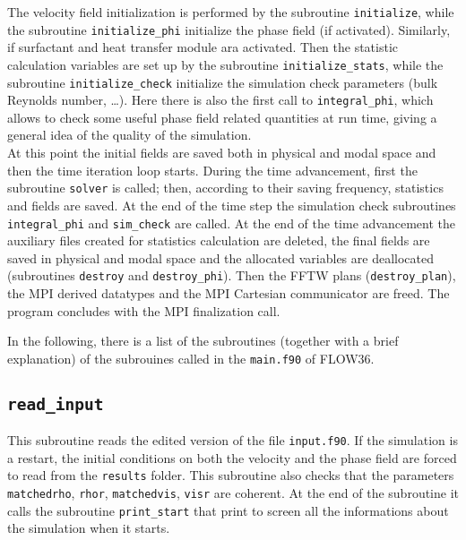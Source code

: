 The velocity field initialization is performed by the subroutine \texttt{initialize}, while the subroutine \texttt{initialize\_phi} initialize the phase field (if activated). 
Similarly, if surfactant and heat transfer module ara activated.
Then the statistic calculation variables are set up by the subroutine \texttt{initialize\_stats}, while the subroutine \texttt{initialize\_check} initialize the simulation check parameters (bulk Reynolds number, \dots). Here there is also the first call to \texttt{integral\_phi}, which allows to check some useful phase field related quantities at run time, giving a general idea of the quality of the simulation.\\
At this point the initial fields are saved both in physical and modal space and then the time iteration loop starts. During the time advancement, first the subroutine \texttt{solver} is called; then, according to their saving frequency, statistics and fields are saved. At the end of the time step  the simulation check subroutines \texttt{integral\_phi} and \texttt{sim\_check} are called.
At the end of the time advancement the auxiliary files created for statistics calculation are deleted, the final fields are saved in physical and modal space and the allocated variables are deallocated (subroutines \texttt{destroy} and \texttt{destroy\_phi}). Then the FFTW plans (\texttt{destroy\_plan}), the MPI derived datatypes and the MPI Cartesian communicator are freed.
The program concludes with the MPI finalization call.

In the following, there is a list of the subroutines (together with a brief explanation) of the subrouines called in the \texttt{main.f90} of FLOW36.

\subsection{\texttt{read\_input}}
This subroutine reads the edited version of the file \texttt{input.f90}. If the simulation is a restart, the initial conditions on both the velocity and the phase field are forced to read from the \texttt{results} folder. This subroutine also checks that the parameters \texttt{matchedrho}, \texttt{rhor}, \texttt{matchedvis}, \texttt{visr} are coherent. At the end of the subroutine it calls the subroutine \texttt{print\_start} that print to screen all the informations about the simulation when it starts.

